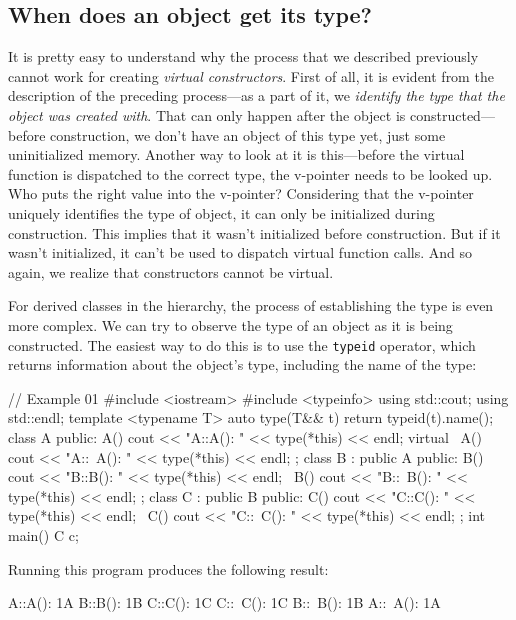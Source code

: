\subsection{When does an object get its type?}

It is pretty easy to understand why the process that we described previously cannot work for creating \emph{virtual constructors}. First of all, it is evident from the description of the preceding process---as a part of it, we \emph{identify the type that the object was created with}. That can only happen after the object is constructed---before construction, we don't have an object of this type yet, just some uninitialized memory. Another way to look at it is this---before the virtual function is dispatched to the correct type, the v-pointer needs to be looked up. Who puts the right value into the v-pointer? Considering that the v-pointer uniquely identifies the type of object, it can only be initialized during construction. This implies that it wasn't initialized before construction. But if it wasn't initialized, it can't be used to dispatch virtual function calls. And so again, we realize that constructors cannot be virtual.

For derived classes in the hierarchy, the process of establishing the type is even more complex. We can try to observe the type of an object as it is being constructed. The easiest way to do this is to use the \texttt{typeid} operator, which returns information about the object's type, including the name of the type:

\begin{code}
// Example 01
#include <iostream>
#include <typeinfo>
using std::cout;
using std::endl;
template <typename T>
auto type(T&& t) { return typeid(t).name(); }
class A {
  public:
  A() { cout << "A::A(): " << type(*this) << endl; }
  virtual
  ~A() { cout << "A::~A(): " << type(*this) << endl; }
};
class B : public A {
  public:
  B() { cout << "B::B(): " << type(*this) << endl; }
  ~B() { cout << "B::~B(): " << type(*this) << endl; }
};
class C : public B {
  public:
  C() { cout << "C::C(): " << type(*this) << endl; }
  ~C() { cout << "C::~C(): " << type(*this) << endl; }
};
int main() {
  C c;
}
\end{code}

Running this program produces the following result:

\begin{code}
A::A(): 1A
B::B(): 1B
C::C(): 1C
C::~C(): 1C
B::~B(): 1B
A::~A(): 1A
\end{code}

